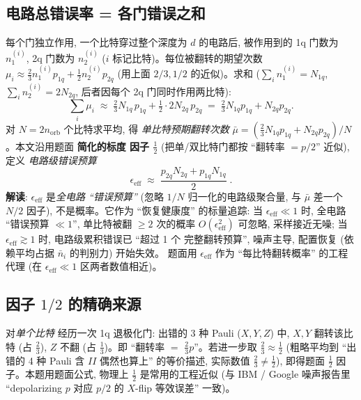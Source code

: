 \documentclass[11pt]{article}
\begin{document}
\subsection*{电路总错误率 = 各门错误之和}
每个门独立作用, 一个比特穿过整个深度为 $d$ 的电路后, 被作用到的 1q 门数为 $n_1^{(i)}$,
2q 门数为 $n_2^{(i)}$ ($i$ 标记比特)。每位被翻转的期望次数
$\mu_i\approx\tfrac23 n_1^{(i)}p_{1q}+\tfrac12 n_2^{(i)}p_{2q}$
(用上面 $2/3,1/2$ 的近似)。求和 ($\sum_i n_1^{(i)}=N_{1q}$,
$\sum_i n_2^{(i)}=2N_{2q}$, 后者因每个 2q 门同时作用两比特):
\[
  \sum_i \mu_i\;\approx\;\tfrac23 N_{1q}\,p_{1q}+\tfrac12\cdot 2N_{2q}\,p_{2q}
                  \;=\;\tfrac23 N_{1q}p_{1q}+N_{2q}p_{2q}.
\]
对 $N=2n_{\text{orb}}$ 个比特求平均, 得 \emph{单比特预期翻转次数}
$\bar\mu=(\tfrac23 N_{1q}p_{1q}+N_{2q}p_{2q})/N$。本文沿用题面 \textbf{简化的标度
因子 $\tfrac12$} (把单/双比特门都按 ``翻转率 $=p/2$'' 近似), 定义
\emph{电路级错误预算}
\[
  \boxed{\;\epsilon_{\text{eff}}\;\approx\;\frac{p_{2q}N_{2q}+p_{1q}N_{1q}}{2}\;.\;}
\]
\textbf{解读}: $\epsilon_{\text{eff}}$ 是\emph{全电路 ``错误预算''} (忽略 $1/N$
归一化的电路级聚合量, 与 $\bar\mu$ 差一个 $N/2$ 因子), 不是概率。它作为
``恢复健康度'' 的标量追踪: 当 $\epsilon_{\text{eff}}\ll1$ 时, 全电路 ``错误预算
$\ll1$'', 单比特被翻 $\ge2$ 次的概率 $O(\epsilon_{\text{eff}}^2)$ 可忽略,
采样接近无噪; 当 $\epsilon_{\text{eff}}\gtrsim1$ 时, 电路级累积错误已 ``超过 1 个
完整翻转预算'', 噪声主导, 配置恢复 (依赖平均占据 $\bar n_i$ 的判别力) 开始失效。
题面用 $\epsilon_{\text{eff}}$ 作为 ``每比特翻转概率'' 的工程代理 (在
$\epsilon_{\text{eff}}\ll1$ 区两者数值相近)。

\subsection*{因子 $1/2$ 的精确来源}
对\emph{单个比特} 经历一次 1q 退极化门: 出错的 3 种 Pauli ($X,Y,Z$) 中,
$X,Y$ 翻转该比特 (占 $\tfrac23$), $Z$ 不翻 (占 $\tfrac13$)。即 ``翻转率 $=$
$\tfrac23 p$''。若进一步取 $\tfrac23\approx\tfrac12$ (粗略平均到 ``出错的 4 种
Pauli 含 $II$ 偶然也算上'' 的等价描述, 实际数值 $\tfrac23\ne\tfrac12$), 即得题面
$\tfrac12$ 因子。本题用题面公式, 物理上 $\tfrac12$ 是常用的工程近似 (与 IBM /
Google 噪声报告里 ``depolarizing $p$ 对应 $p/2$ 的 $X$-flip 等效误差'' 一致)。
\end{document}
